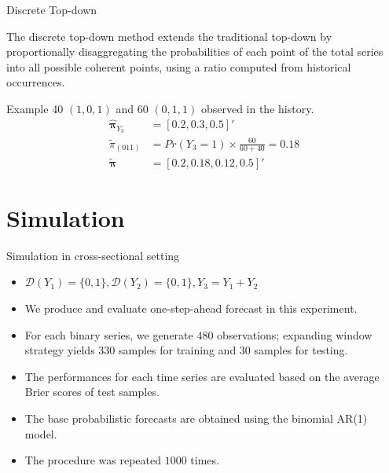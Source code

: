 \documentclass[12pt]{beamer}
\begin{document}
\begin{frame}{Discrete Top-down}

    The discrete top-down method extends the traditional top-down by proportionally disaggregating the probabilities of each point of the total series into all possible coherent points, using a ratio computed from historical occurrences.

    \begin{block}{Example}
        40 $(1, 0, 1)$ and 60 $(0, 1, 1)$ observed in the history.
        \[
            \begin{aligned}
                \hat{\boldsymbol{\pi}}_{Y_3} &= [0.2, 0.3, 0.5]' \\   
                \tilde{\pi}_{(011)} &= Pr(Y_3=1)\times\frac{60}{60+40} = 0.18\\
                \tilde{\boldsymbol{\pi}} &= [0.2, 0.18, 0.12, 0.5]'
            \end{aligned}
        \]
    \end{block}
\end{frame}

\section{Simulation}

\begin{frame}{Simulation in cross-sectional setting}
\begin{itemize}
    \item $\mathcal{D}(Y_1) = \{0, 1\}, \mathcal{D}(Y_2) = \{0, 1\}, Y_3 = Y_1 + Y_2$
    \item We produce and evaluate one-step-ahead forecast in this experiment.
    \item For each binary series, we generate $480$ observations; expanding window strategy yields $330$ samples for training and $30$ samples for testing.
    \item The performances for each time series are evaluated based on the average Brier scores of test samples.
    \item The base probabilistic forecasts are obtained using the binomial AR(1) model.
    \item The procedure was repeated $1000$ times.
\end{itemize}
\end{frame}
\end{document}
